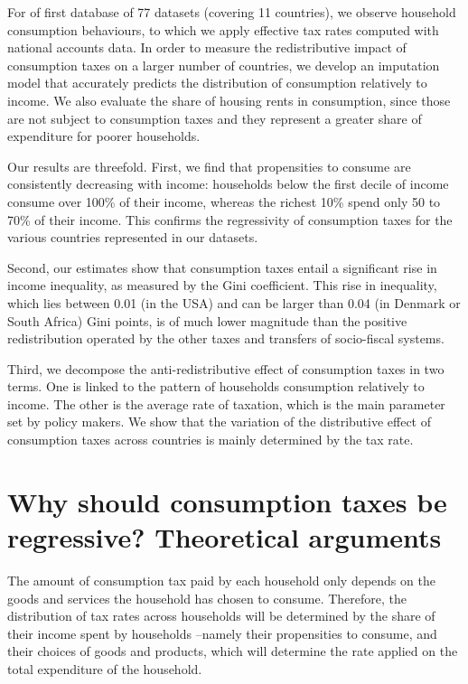 \documentclass[12pt]{article}
\begin{document}
For of first database of 77 datasets (covering 11 countries), we observe household consumption behaviours, to which we apply effective tax rates computed with national accounts data. In order to measure the redistributive impact of consumption taxes on a larger number of countries,  we develop an imputation model that accurately predicts the distribution of consumption relatively to income. We also evaluate the share of housing rents in consumption, since those are not subject to consumption taxes and they represent a greater share of expenditure for poorer households.

Our results are threefold. First, we find that propensities to consume are consistently decreasing with income: households below the first decile of income consume over 100\% of their income, whereas the richest 10\% spend only 50 to 70\% of their income. This confirms the regressivity of consumption taxes for the various countries represented in our datasets.

Second, our estimates show that consumption taxes entail a significant rise in income inequality, as measured by the Gini coefficient. This rise in inequality, which lies between 0.01 (in the USA) and can be larger than 0.04 (in Denmark or South Africa) Gini points, is of much lower magnitude than the positive redistribution operated by the other taxes and transfers of socio-fiscal systems.

Third, we decompose the anti-redistributive effect of consumption taxes in two terms. One is linked to the pattern of households consumption relatively to income. The other is the average rate of taxation, which is the main parameter set by policy makers. We show that the variation of the distributive effect of consumption taxes across countries is mainly determined by the tax rate.


\section{Why should consumption taxes be regressive? Theoretical arguments}

\label{sub:sources}

The amount of consumption tax paid by each household  only depends on the goods and services the household has chosen to consume. Therefore, the distribution of tax rates across households will be determined by the share of their income spent by households --namely their propensities to consume, and their choices of goods and products, which will determine the rate applied on the total expenditure of the household.
\end{document}
